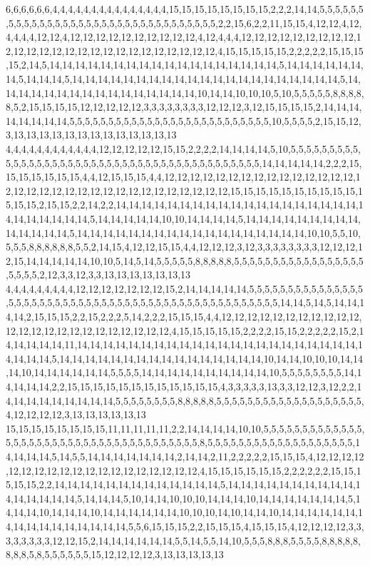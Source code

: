 6,6,6,6,6,6,4,4,4,4,4,4,4,4,4,4,4,4,4,4,4,15,15,15,15,15,15,15,15,2,2,2,14,14,5,5,5,5,5,5,5,5,5,5,5,5,5,5,5,5,5,5,5,5,5,5,5,5,5,5,5,5,5,5,5,5,5,2,2,15,6,2,2,11,15,15,4,12,12,4,12,4,4,4,4,12,12,4,12,12,12,12,12,12,12,12,12,12,4,12,4,4,4,12,12,12,12,12,12,12,12,12,12,12,12,12,12,12,12,12,12,12,12,12,12,12,12,12,12,4,15,15,15,15,15,2,2,2,2,2,15,15,15,15,2,14,5,14,14,14,14,14,14,14,14,14,14,14,14,14,14,14,14,14,14,5,14,14,14,14,14,14,14,5,14,14,14,5,14,14,14,14,14,14,14,14,14,14,14,14,14,14,14,14,14,14,14,14,14,5,14,14,14,14,14,14,14,14,14,14,14,14,14,14,14,14,10,14,14,10,10,10,5,10,5,5,5,5,5,8,8,8,8,8,5,2,15,15,15,15,12,12,12,12,12,3,3,3,3,3,3,3,3,12,12,12,3,12,15,15,15,15,2,14,14,14,14,14,14,14,14,5,5,5,5,5,5,5,5,5,5,5,5,5,5,5,5,5,5,5,5,5,5,5,5,5,5,10,5,5,5,5,2,15,15,12,3,13,13,13,13,13,13,13,13,13,13,13,13,13
4,4,4,4,4,4,4,4,4,4,4,4,12,12,12,12,12,15,15,2,2,2,2,14,14,14,14,5,10,5,5,5,5,5,5,5,5,5,5,5,5,5,5,5,5,5,5,5,5,5,5,5,5,5,5,5,5,5,5,5,5,5,5,5,5,5,5,5,5,5,5,14,14,14,14,14,2,2,2,15,15,15,15,15,15,15,4,4,12,15,15,15,4,4,12,12,12,12,12,12,12,12,12,12,12,12,12,12,12,12,12,12,12,12,12,12,12,12,12,12,12,12,12,12,12,12,12,15,15,15,15,15,15,15,15,15,15,15,15,15,2,15,15,2,2,14,2,2,14,14,14,14,14,14,14,14,14,14,14,14,14,14,14,14,14,14,14,14,14,14,14,14,14,14,5,14,14,14,14,14,10,10,14,14,14,14,5,14,14,14,14,14,14,14,14,14,14,14,14,14,14,5,14,14,14,14,14,14,14,14,14,14,14,14,14,14,14,14,14,14,10,10,5,5,10,5,5,5,8,8,8,8,8,8,5,5,2,14,15,4,12,12,15,15,4,4,12,12,12,3,12,3,3,3,3,3,3,3,3,12,12,12,12,15,14,14,14,14,14,10,10,5,14,5,14,5,5,5,5,5,8,8,8,8,8,5,5,5,5,5,5,5,5,5,5,5,5,5,5,5,5,5,5,5,5,5,2,12,3,3,12,3,3,13,13,13,13,13,13,13
4,4,4,4,4,4,4,4,4,12,12,12,12,12,12,12,15,2,14,14,14,14,14,5,5,5,5,5,5,5,5,5,5,5,5,5,5,5,5,5,5,5,5,5,5,5,5,5,5,5,5,5,5,5,5,5,5,5,5,5,5,5,5,5,5,5,5,5,5,5,5,5,5,14,14,5,14,5,14,14,14,14,2,15,15,15,2,2,15,2,2,2,5,14,2,2,2,15,15,15,4,4,12,12,12,12,12,12,12,12,12,12,12,12,12,12,12,12,12,12,12,12,12,12,12,12,4,15,15,15,15,15,2,2,2,2,15,15,2,2,2,2,2,15,2,14,14,14,14,14,11,14,14,14,14,14,14,14,14,14,14,14,14,14,14,14,14,14,14,14,14,14,14,14,14,14,14,5,14,14,14,14,14,14,14,14,14,14,14,14,14,14,14,14,10,14,14,10,10,10,14,14,14,10,14,14,14,14,14,14,5,5,5,5,14,14,14,14,14,14,14,14,14,14,10,5,5,5,5,5,5,5,5,14,14,14,14,14,2,2,15,15,15,15,15,15,15,15,15,15,15,15,4,3,3,3,3,3,13,3,3,12,12,3,12,2,2,14,14,14,14,14,14,14,14,14,5,5,5,5,5,5,5,5,8,8,8,8,8,5,5,5,5,5,5,5,5,5,5,5,5,5,5,5,5,5,5,5,4,12,12,12,12,3,13,13,13,13,13,13
15,15,15,15,15,15,15,15,11,11,11,11,11,2,2,14,14,14,14,10,10,5,5,5,5,5,5,5,5,5,5,5,5,5,5,5,5,5,5,5,5,5,5,5,5,5,5,5,5,5,5,5,5,5,5,5,5,5,5,8,5,5,5,5,5,5,5,5,5,5,5,5,5,5,5,5,5,5,5,14,14,14,14,5,14,5,5,14,14,14,14,14,14,14,2,14,14,2,11,2,2,2,2,2,15,15,15,4,12,12,12,12,12,12,12,12,12,12,12,12,12,12,12,12,12,12,12,4,15,15,15,15,15,15,2,2,2,2,2,2,15,15,15,15,15,2,2,14,14,14,14,14,14,14,14,14,14,14,14,14,5,14,14,14,14,14,14,14,14,14,14,14,14,14,14,14,14,5,14,14,14,5,10,14,14,10,10,10,14,14,14,10,14,14,14,14,14,14,14,5,14,14,14,10,14,14,14,10,14,14,14,14,14,14,10,10,10,14,10,14,14,10,14,14,14,14,14,14,14,14,14,14,14,14,14,14,14,14,5,5,6,15,15,15,2,2,15,15,15,4,15,15,15,4,12,12,12,12,3,3,3,3,3,3,3,3,12,12,15,2,14,14,14,14,14,14,5,5,14,5,5,14,10,5,5,5,8,8,8,5,5,5,5,8,8,8,8,8,8,8,8,5,8,5,5,5,5,5,5,15,12,12,12,12,3,13,13,13,13,13
